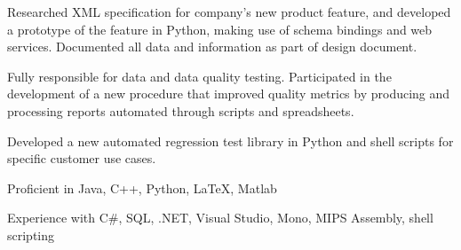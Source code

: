 \documentclass{article}
\begin{document}
\vspace*{0.25em}

  Researched
XML specification for company's new product feature, and developed
a prototype of the feature in Python, making use of schema bindings
and web services.  Documented all data and information as part of
design document.

\begin{reslist}
  \item Fully responsible for data and data quality
    testing. Participated in the development of a new procedure that
    improved quality metrics by producing and processing reports
    automated through scripts and spreadsheets.
  \item Developed a new automated regression test library in Python
    and shell scripts for specific customer use cases.
\end{reslist}


\begin{reslist}
\item Proficient in Java, C++, Python, \LaTeX, {\sc Matlab}
\item Experience with C\#, SQL, .NET, Visual Studio, Mono, MIPS Assembly, shell scripting
\end{reslist}

\vspace*{-0.5em}
\end{document}
